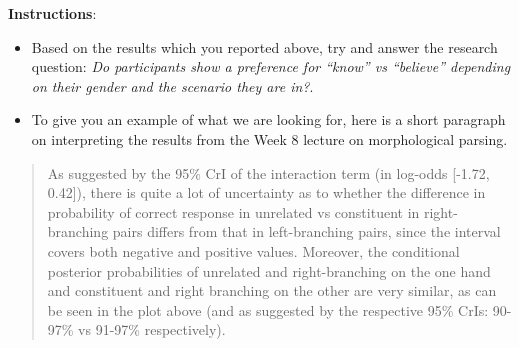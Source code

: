 \documentclass[
]{article}
\providecommand{\tightlist}{%
  \setlength{\itemsep}{0pt}\setlength{\parskip}{0pt}}
\begin{document}
\textbf{Instructions}:

\begin{itemize}
\tightlist
\item
  Based on the results which you reported above, try and answer the
  research question: \emph{Do participants show a preference for
  ``know'' vs ``believe'' depending on their gender and the scenario
  they are in?}.
\item
  To give you an example of what we are looking for, here is a short
  paragraph on interpreting the results from the Week 8 lecture on
  morphological parsing.
\end{itemize}

\begin{quote}
As suggested by the 95\% CrI of the interaction term (in log-odds
{[}-1.72, 0.42{]}), there is quite a lot of uncertainty as to whether
the difference in probability of correct response in unrelated vs
constituent in right-branching pairs differs from that in left-branching
pairs, since the interval covers both negative and positive values.
Moreover, the conditional posterior probabilities of unrelated and
right-branching on the one hand and constituent and right branching on
the other are very similar, as can be seen in the plot above (and as
suggested by the respective 95\% CrIs: 90-97\% vs 91-97\% respectively).
\end{quote}
\end{document}
